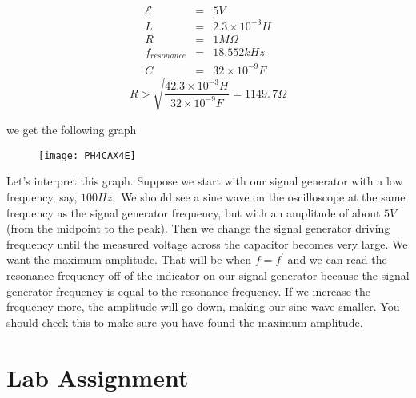 \begin{eqnarray*}
	\mathcal{E} &=&5\unit{V} \\
	          L &=&2.3\times 10^{-3}\unit{H} \\
			  R &=&1\unit{M\Omega} \\
  f_{resonance} &=&18.552\unit{kHz} \\
              C &=&32\times 10^{-9}\unit{F}
\end{eqnarray*}
\begin{equation*}
	R>\sqrt{\frac{42.3\times 10^{-3}\unit{H}}{32\times 10^{-9}\unit{F}}}=1149.\,\allowbreak 7\unit{\Omega}
\end{equation*}

\noindent we get the following graph
\vspace{0.2in}
\begin{figure}[h!]
	\centering
	\texttt{[image: PH4CAX4E]}
\end{figure}

Let's interpret this graph. Suppose we start with our signal generator with a low frequency, say, $100\unit{Hz},$ We should see a sine wave on the oscilloscope at the same frequency as the signal generator frequency, but with an amplitude of about $5\unit{V}$ (from the midpoint to the peak). Then we change the signal generator driving frequency until the measured voltage across the capacitor becomes very large. We want the maximum amplitude. That will be when $f=f^{\prime }$ and we can read the resonance frequency off of the indicator on our signal generator because the signal generator frequency is equal to the resonance frequency. If we increase the frequency more, the amplitude will go down, making our sine wave smaller. You should check this to make sure you have found the maximum amplitude.

\section{Lab Assignment}

